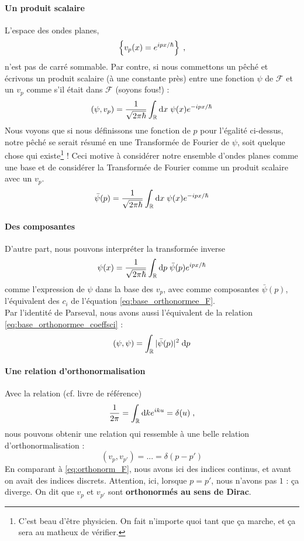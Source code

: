 \documentclass[../notesdecours.tex]{subfiles}
\begin{document}
\paragraph{Un produit scalaire}
L'espace des ondes planes,
$$\left\{ v_p(x) = e^{ipx/\hbar}\right\}\; ,$$
n'est pas de carré sommable. Par contre, si nous commettons un pêché et écrivons un produit scalaire (à une constante près) entre une fonction $\psi$ de $\mathcal F$ et un $v_p$ comme s'il était dans $\mathcal F$ (soyons fous!) :
$$(\psi, v_p) = \dfrac{1}{\sqrt{2\pi\hbar}} \int_{\mathbb R}\mathrm{d} x \; \psi(x) e^{-ipx/\hbar}$$
Nous voyons que si nous définissons une fonction de $p$ pour l'égalité ci-dessus, notre pêché se serait résumé en une Transformée de Fourier de $\psi$, soit quelque chose qui existe\footnote{C'est beau d'être physicien. On fait n'importe quoi tant que ça marche, et ça sera au matheux de vérifier.} ! Ceci motive à considérer notre ensemble d'ondes planes comme une base et de considérer la Transformée de Fourier comme un produit scalaire avec un $v_p$.
$$\bar{\psi}(p) = \dfrac{1}{\sqrt{2\pi\hbar}} \int_{\mathbb R}\mathrm{d} x \; \psi(x) e^{-ipx/\hbar}$$
\paragraph{Des composantes}
D'autre part, nous pouvons interpréter la transformée inverse
$$\psi(x) = \dfrac{1}{\sqrt{2\pi\hbar}} \int_{\mathbb R}\mathrm{d} p \; \bar\psi(p) e^{ipx/\hbar}$$
comme l'expression de $\psi$ dans la base des $v_p$, avec comme composantes $\bar \psi(p)$, l'équivalent des $c_i$ de l'équation \eqref{eq:base_orthonormee_F}. \\

Par l'identité de Parseval, nous avons aussi l'équivalent de la relation \eqref{eq:base_orthonormee_coeffsci} :
$$(\psi, \psi) = \int_{\mathbb R} |\bar \psi(p)|^2 \; \mathrm{d} p$$
\paragraph{Une relation d'orthonormalisation}
Avec la relation (cf. livre de référence) 
$$\dfrac{1}{2\pi} = \int_{\mathbb R} \mathrm{d} k e^{iku} = \delta(u) \; ,$$
nous pouvons obtenir une relation qui ressemble à une belle relation d'orthonormalisation :
$$(v_p, v_{p'}) = ... = \delta(p-p')$$
En comparant à \eqref{eq:orthonorm_F}, nous avons ici des indices continus, et avant on avait des indices discrets. Attention, ici, lorsque $p = p'$, nous n'avons pas $1$ : ça diverge. On dit que $v_p$ et $v_{p'}$ sont \textbf{orthonormés au sens de Dirac}. \\
\end{document}
